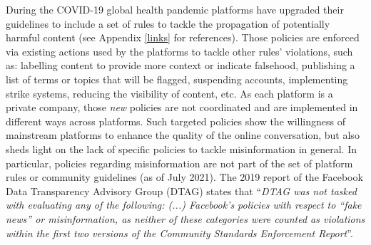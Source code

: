 \documentclass{article}
\begin{document}

\smallskip

During the COVID-19 global health pandemic platforms have upgraded their guidelines to include a set of rules to tackle the propagation of potentially harmful content (see Appendix \ref{links} for references). Those policies are enforced via existing actions used by the platforms to tackle other rules' violations, such as: labelling content to provide more context or indicate falsehood, publishing a list of terms or topics that will be flagged, suspending accounts, implementing strike systems, reducing the visibility of content, etc. As each platform is a private company, those {\it new} policies are not coordinated and are implemented in different ways across platforms. Such targeted policies show the willingness of mainstream platforms to enhance the quality of the online conversation, but also sheds light on the lack of specific policies to tackle misinformation in general. In particular, policies regarding misinformation are not part of the set of platform rules or community guidelines (as of July 2021). The 2019 report of the Facebook Data Transparency Advisory Group (DTAG) states that ``{\it DTAG was not tasked with evaluating any of the following: (...) Facebook’s policies with respect to “fake news” or misinformation, as neither of these categories were counted as violations within the first two versions of the Community Standards Enforcement Report}''. %

\smallskip
 
\end{document}
